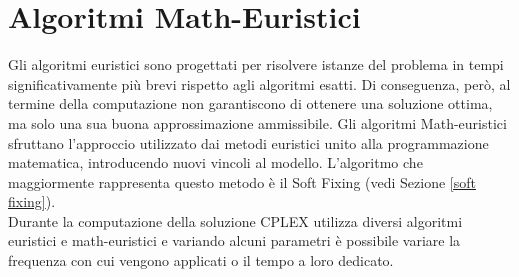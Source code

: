 \section{Algoritmi Math-Euristici}
Gli algoritmi euristici sono progettati per risolvere istanze del problema in tempi significativamente più brevi rispetto agli algoritmi esatti. Di conseguenza, però, al termine della computazione non garantiscono di ottenere una soluzione ottima, ma solo una sua buona approssimazione ammissibile. Gli algoritmi Math-euristici sfruttano l'approccio utilizzato dai metodi euristici unito alla programmazione matematica, introducendo nuovi vincoli al modello. L'algoritmo che maggiormente rappresenta questo metodo è il Soft Fixing (vedi Sezione \ref{soft fixing}). \\
Durante la computazione della soluzione CPLEX utilizza diversi algoritmi euristici e math-euristici e variando alcuni parametri è possibile variare la frequenza con cui vengono applicati o il tempo a loro dedicato. 

